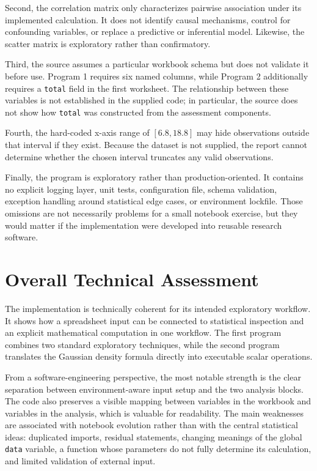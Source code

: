 \documentclass[11pt,a4paper]{article}
\begin{document}
Second, the correlation matrix only characterizes pairwise association under its implemented calculation. It does not identify causal mechanisms, control for confounding variables, or replace a predictive or inferential model. Likewise, the scatter matrix is exploratory rather than confirmatory.

Third, the source assumes a particular workbook schema but does not validate it before use. Program 1 requires six named columns, while Program 2 additionally requires a \texttt{total} field in the first worksheet. The relationship between these variables is not established in the supplied code; in particular, the source does not show how \texttt{total} was constructed from the assessment components.

Fourth, the hard-coded x-axis range of $[6.8,18.8]$ may hide observations outside that interval if they exist. Because the dataset is not supplied, the report cannot determine whether the chosen interval truncates any valid observations.

Finally, the program is exploratory rather than production-oriented. It contains no explicit logging layer, unit tests, configuration file, schema validation, exception handling around statistical edge cases, or environment lockfile. Those omissions are not necessarily problems for a small notebook exercise, but they would matter if the implementation were developed into reusable research software.

\section{Overall Technical Assessment}
The implementation is technically coherent for its intended exploratory workflow. It shows how a spreadsheet input can be connected to statistical inspection and an explicit mathematical computation in one workflow. The first program combines two standard exploratory techniques, while the second program translates the Gaussian density formula directly into executable scalar operations.

From a software-engineering perspective, the most notable strength is the clear separation between environment-aware input setup and the two analysis blocks. The code also preserves a visible mapping between variables in the workbook and variables in the analysis, which is valuable for readability. The main weaknesses are associated with notebook evolution rather than with the central statistical ideas: duplicated imports, residual statements, changing meanings of the global \texttt{data} variable, a function whose parameters do not fully determine its calculation, and limited validation of external input.
\end{document}
